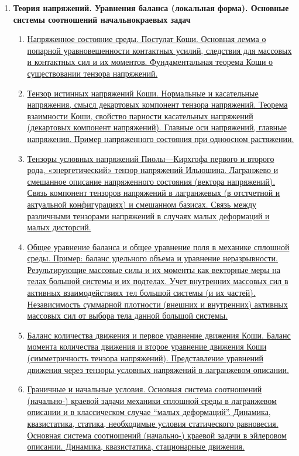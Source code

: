 \documentclass[a4paper,12pt]{article}
\begin{document}
\begin{enumerate}
\begin{enumerate}
\end{enumerate}

\item \textbf{Теория напряжений. Уравнения баланса (локальная форма). Основные системы соотношений начальнокраевых задач}


\begin{enumerate}

\item \hyperlink{bil4_1}{Напряженное состояние среды. Постулат Коши. Основная лемма о попарной уравновешенности контактных усилий, следствия для массовых и контактных сил и их моментов. Фундаментальная теорема Коши о существовании тензора напряжений. }
\item \hyperlink{bil4_2}{ Тензор истинных напряжений Коши. Нормальные и касательные напряжения, смысл декартовых компонент тензора напряжений. Теорема взаимности Коши, свойство парности касательных напряжений (декартовых компонент напряжений). Главные оси напряжений, главные напряжения. Пример напряженного состояния при одноосном растяжении.}
\item \hyperlink{bil4_3}{Тензоры условных напряжений Пиолы—Кирхгофа первого и второго рода, «энергетический» тензор напряжений Ильюшина. Лагранжево и смешанное описание напряженного состояния (вектора напряжений). Связь компонент тензоров напряжений в лагранжевых (в отстчетной и актуальной конфигурациях) и смешанном базисах. Связь между различными тензорами напряжений в случаях малых деформаций и малых дисторсий. }
\item \hyperlink{bil4_4}{Общее уравнение баланса и общее уравнение поля в механике сплошной среды. Пример: баланс удельного объема и уравнение неразрывности. Результирующие массовые силы и их моменты как векторные меры на телах большой системы и их подтелах. Учет внутренних массовых сил в активных взаимодействиях тел большой системы (и их частей). Независимость суммарной плотности (внешних и внутренних) активных массовых сил от выбора тела данной большой системы.}
\item \hyperlink{bil4_5}{Баланс количества движения и первое уравнение движения Коши. Баланс момента количества движения и второе уравнение движения Коши (симметричность тензора напряжений). Представление уравнений движения через тензоры условных напряжений в лагранжевом описании.}
\item \hyperlink{bil4_6}{Граничные и начальные условия. Основная система соотношений (начально-) краевой задачи механики сплошной среды в лагранжевом описании и в классическом случае “малых деформаций”. Динамика, квазистатика, статика, необходимые условия статического равновесия. Основная система соотношений (начально-) краевой задачи в эйлеровом описании. Динамика, квазистатика, стационарные движения.}


\end{enumerate}
\end{enumerate}
\end{document}
